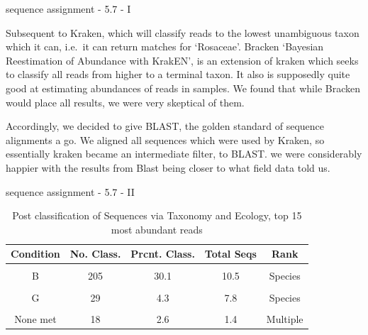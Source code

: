 \documentclass[
  ignorenonframetext,
]{beamer}
\begin{document}
\begin{frame}{sequence assignment - 5.7 - I}
{Subsequent to Kraken, which will classify reads to the lowest
unambiguous taxon which it can, i.e.~it can return matches for
`Rosaceae'. Bracken `Bayesian Reestimation of Abundance with KrakEN', is
an extension of kraken which seeks to classify all reads from higher to
a terminal taxon. It also is supposedly quite good at estimating
abundances of reads in samples. We found that while Bracken would place
all results, we were very skeptical of them.

Accordingly, we decided to give BLAST, the golden standard of sequence
alignments a go. We aligned all sequences which were used by Kraken, so
essentially kraken became an intermediate filter, to BLAST. we were
considerably happier with the results from Blast being closer to what
field data told us.}
\end{frame}

\begin{frame}{sequence assignment - 5.7 - II}
\protect\hypertarget{sequence-assignment---5.7---ii}{}
\begin{table}

\caption{\label{tab:unnamed-chunk-4}Post classification of Sequences via Taxonomy and Ecology,
top 15 most abundant reads}
\centering
\begin{tabular}[t]{c|c|c|c|c}
\hline
Condition & No. Class. & Prcnt. Class. & Total Seqs & Rank\\
\hline
\cellcolor{gray!10}{A} & \cellcolor{gray!10}{143} & \cellcolor{gray!10}{21.0} & \cellcolor{gray!10}{32.0} & \cellcolor{gray!10}{Species}\\
\hline
B & 205 & 30.1 & 10.5 & Species\\
\hline
\cellcolor{gray!10}{C} & \cellcolor{gray!10}{5} & \cellcolor{gray!10}{0.7} & \cellcolor{gray!10}{0.4} & \cellcolor{gray!10}{Genus}\\
\hline
G & 29 & 4.3 & 7.8 & Species\\
\hline
\cellcolor{gray!10}{H} & \cellcolor{gray!10}{280} & \cellcolor{gray!10}{41.2} & \cellcolor{gray!10}{47.9} & \cellcolor{gray!10}{Genus}\\
\hline
None met & 18 & 2.6 & 1.4 & Multiple\\
\hline
\end{tabular}
\end{table}

\end{frame}
\end{document}
